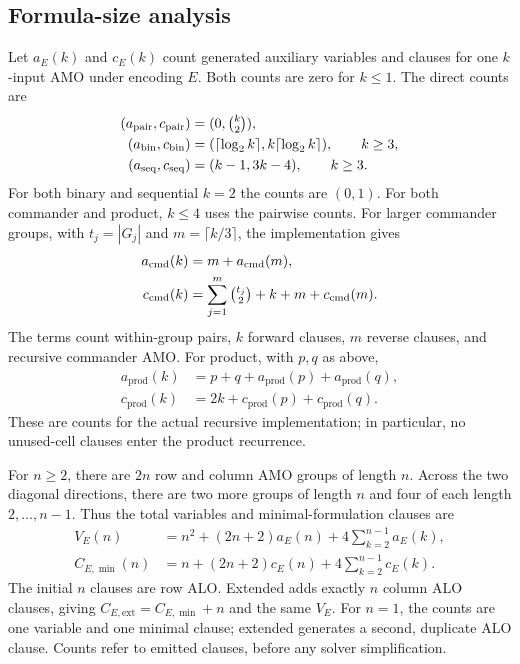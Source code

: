 \subsection{Formula-size analysis}
Let $a_E(k)$ and $c_E(k)$ count generated auxiliary variables and clauses
for one $k$-input AMO under encoding $E$. Both counts are zero for $k\le1$.
The direct counts are
\begin{align}
(a_{\mathrm{pair}},c_{\mathrm{pair}})&=(0,\tbinom{k}{2}),\\
(a_{\mathrm{bin}},c_{\mathrm{bin}})&=(\lceil\log_2 k\rceil,
k\lceil\log_2 k\rceil),\qquad k\ge3,\\
(a_{\mathrm{seq}},c_{\mathrm{seq}})&=(k-1,3k-4),\qquad k\ge3.
\end{align}
For both binary and sequential $k=2$ the counts are $(0,1)$.
For both commander and
product, $k\le4$ uses the pairwise counts. For larger commander groups,
with $t_j=|G_j|$ and $m=\lceil k/3\rceil$, the implementation gives
\begin{align}
a_{\mathrm{cmd}}(k)&=m+a_{\mathrm{cmd}}(m),\\
c_{\mathrm{cmd}}(k)&=\sum_{j=1}^m\tbinom{t_j}{2}+k+m+c_{\mathrm{cmd}}(m).
\end{align}
The terms count within-group pairs, $k$ forward clauses, $m$ reverse
clauses, and recursive commander AMO. For product, with $p,q$ as above,
\begin{align}
a_{\mathrm{prod}}(k)&=p+q+a_{\mathrm{prod}}(p)+a_{\mathrm{prod}}(q),\\
c_{\mathrm{prod}}(k)&=2k+c_{\mathrm{prod}}(p)+c_{\mathrm{prod}}(q).
\end{align}
These are counts for the actual recursive implementation; in particular,
no unused-cell clauses enter the product recurrence.

For $n\ge2$, there are $2n$ row and column AMO groups of length $n$.
Across the two diagonal directions, there are two more groups of length
$n$ and four of each length $2,\ldots,n-1$. Thus the total variables and
minimal-formulation clauses are
\begin{align}
V_E(n)&=n^2+(2n+2)a_E(n)+4\sum_{k=2}^{n-1}a_E(k),\label{eq:size-vars}\\
C_{E,\min}(n)&=n+(2n+2)c_E(n)+4\sum_{k=2}^{n-1}c_E(k).
\label{eq:size-clauses}
\end{align}
The initial $n$ clauses are row ALO. Extended adds exactly $n$ column
ALO clauses, giving $C_{E,\mathrm{ext}}=C_{E,\min}+n$ and the same $V_E$.
For $n=1$, the counts are one variable and one minimal clause; extended
generates a second, duplicate ALO clause. Counts refer to emitted clauses,
before any solver simplification.


